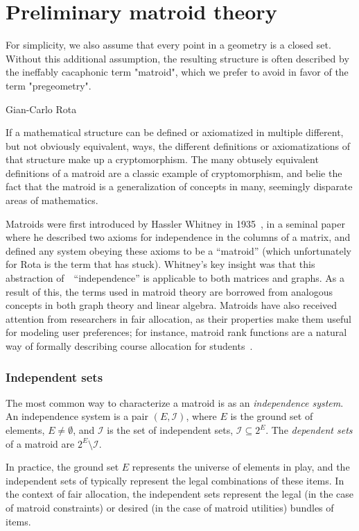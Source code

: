 \chapter{Preliminary matroid theory}
\label{sec:matroid-theory}
\epigraph{For simplicity, we also assume that every point in a geometry is a closed set. Without this additional assumption, the resulting structure is often described by the ineffably cacaphonic term "matroid", which we prefer to avoid in favor of the term "pregeometry".}{Gian-Carlo Rota \cite{crapo_rota_1970}}

If a mathematical structure can be defined or axiomatized in multiple different, but not obviously equivalent, ways, the different definitions or axiomatizations of that structure make up a cryptomorphism. The many obtusely equivalent definitions of a matroid are a classic example of cryptomorphism, and belie the fact that the matroid is a generalization of concepts in many, seemingly disparate areas of mathematics.

Matroids were first introduced by Hassler Whitney in 1935~\cite{whitney-1935}, in a seminal paper where he described two axioms for independence in the columns of a matrix, and defined any system obeying these axioms to be a ``matroid'' (which unfortunately for Rota is the term that has stuck). Whitney's key insight was that this abstraction of~~``independence'' is applicable to both matrices and graphs. As a result of this, the terms used in matroid theory are borrowed from analogous concepts in both graph theory and linear algebra. Matroids have also received attention from researchers in fair allocation, as their properties make them useful for modeling user preferences; for instance, matroid rank functions are a natural way of formally describing course allocation for students~\cite{benabbou-2021}. 

\subsection*{Independent sets}
The most common way to characterize a matroid is as an \textit{independence system}. An independence system is a pair $(E, \mathcal{I})$, where $E$ is the ground set of elements, $E \not= \emptyset$, and $\mathcal{I}$ is the set of independent sets, $\mathcal{I} \subseteq 2^E$. The \textit{dependent sets} of a matroid are $2^E \setminus \mathcal{I}$. 

In practice, the ground set $E$ represents the universe of elements in play, and the independent sets of typically represent the legal combinations of these items. In the context of fair allocation, the independent sets represent the legal (in the case of matroid constraints) or desired (in the case of matroid utilities) bundles of items.

